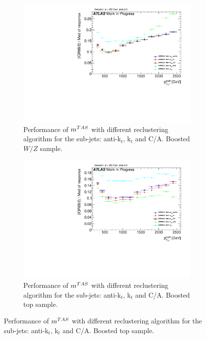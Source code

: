 \begin{figure}
    \centering
    \begin{subfigure}[b]{0.45\textwidth}
        \centering
   \includegraphics[width=\textwidth]{jet_part/mtas/71graphcftr_h_JetRatio_mJ12CALOIQRoM_Wprime_Allalgos.pdf}
    \caption{Performance of $m^{TAS}$ with different reclustering algorithm for the sub-jets: anti-k$_t$, k$_t$ and C/A. Boosted $W/Z$ sample.}
    \label{fig:allalgow}
    \end{subfigure}
    \begin{subfigure}[b]{0.45\textwidth}
        \centering
   \includegraphics[width=\textwidth]{jet_part/mtas/71graphcftr_h_JetRatio_mJ12CALOTopsCalib.pdf}
    \caption{Performance of $m^{TAS}$ with different reclustering algorithm for the sub-jets: anti-k$_t$, k$_t$ and C/A. Boosted top sample.}

\end{subfigure}
\end{figure}
